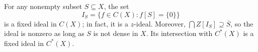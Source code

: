 For any nonempty subset $S \subseteq X$, the set
$$I_S = \{f \in C(X) : f[S] = \{0\}\}$$
is a fixed ideal in $C(X)$; in fact, it is a $z$-ideal. Moreover, $\bigcap Z[I_S] \supseteq \overline{S}$, so the ideal is nonzero as long as $S$ is not dense in $X$. Its intersection with $C^*(X)$ is a fixed ideal in $C^*(X)$.
